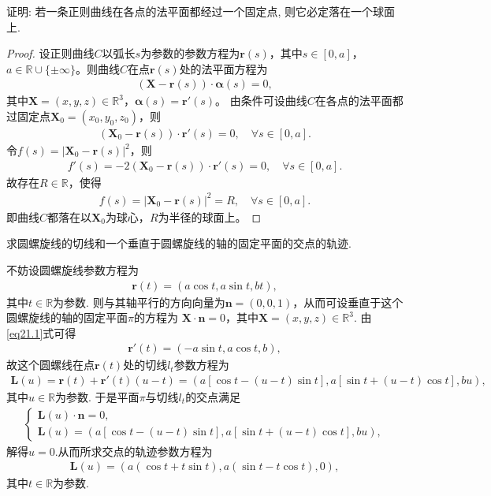\documentclass[../../main.tex]{subfiles}%
\begin{document}
\begin{example}
证明: 若一条正则曲线在各点的法平面都经过一个固定点, 则它必定落在一个球面上.
\end{example}
\begin{proof}
设正则曲线$C$以弧长$s$为参数的参数方程为$\bm{r}(s)$，其中$s\in[0,a]$，$a\in\mathbb{R}\cup\{\pm\infty\}$。则曲线$C$在点$\bm{r}(s)$处的法平面方程为
\begin{align*}
(\bm{X}-\bm{r}(s))\cdot\bm{\alpha}(s)=0,
\end{align*}
其中$\bm{X}=(x,y,z)\in\mathbb{R}^3$，$\bm{\alpha}(s)=\bm{r}'(s)$。
由条件可设曲线$C$在各点的法平面都过固定点$\bm{X}_0=(x_0,y_0,z_0)$，则
\begin{align*}
(\bm{X}_0-\bm{r}(s))\cdot\bm{r}'(s)=0,\quad \forall s\in[0,a].
\end{align*}
令$f(s)=|\bm{X}_0-\bm{r}(s)|^2$，则
\begin{align*}
f'(s)=-2(\bm{X}_0-\bm{r}(s))\cdot\bm{r}'(s)=0,\quad \forall s\in[0,a].
\end{align*}
故存在$R\in\mathbb{R}$，使得
\begin{align*}
f(s)=|\bm{X}_0-\bm{r}(s)|^2=R,\quad \forall s\in[0,a].
\end{align*}
即曲线$C$都落在以$\bm{X}_0$为球心，$R$为半径的球面上。
\end{proof}

\begin{example}
求圆螺旋线的切线和一个垂直于圆螺旋线的轴的固定平面的交点的轨迹.
\end{example}
\begin{solution}
不妨设圆螺旋线参数方程为
\begin{align}
\bm{r}(t)=(a\cos t,a\sin t,bt),
\end{align}
其中$t\in\mathbb{R}$为参数.\label{eq21.1}
则与其轴平行的方向向量为$\bm{n}=(0,0,1)$，从而可设垂直于这个圆螺旋线的轴的固定平面$\pi$的方程为
$\bm{X}\cdot\bm{n}=0$，其中$\bm{X}=(x,y,z)\in\mathbb{R}^3$.
由\eqref{eq21.1}式可得
\begin{align*}
\bm{r}'(t)=(-a\sin t,a\cos t,b),
\end{align*}
故这个圆螺线在点$\bm{r}(t)$处的切线$l_t$参数方程为
\begin{align*}
\bm{L}(u)=\bm{r}(t)+\bm{r}'(t)(u-t)=\left(a\left[\cos t-(u-t)\sin t\right],a\left[\sin t+(u-t)\cos t\right],bu\right),
\end{align*}
其中$u\in\mathbb{R}$为参数.
于是平面$\pi$与切线$l_t$的交点满足
\begin{align*}
\begin{cases}
\bm{L}(u)\cdot\bm{n}=0,\\
\bm{L}(u)=\left(a\left[\cos t-(u-t)\sin t\right],a\left[\sin t+(u-t)\cos t\right],bu\right),
\end{cases}
\end{align*}
解得$u=0$.从而所求交点的轨迹参数方程为
\begin{align*}
\bm{L}(u)=\left(a(\cos t+t\sin t),a(\sin t-t\cos t),0\right),
\end{align*}
其中$t\in\mathbb{R}$为参数.

\end{solution}
\end{document}
